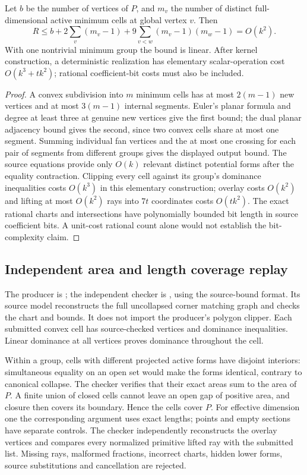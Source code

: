 \begin{proposition}
Let $b$ be the number of vertices of $P$, and $m_v$ the number of distinct
full-dimensional active minimum cells at global vertex $v$. Then
\[
 R\le b+2\sum_v(m_v-1)
           +9\sum_{v<w}(m_v-1)(m_w-1)=O(k^2).
\]
With one nontrivial minimum group the bound is linear. After kernel
construction, a deterministic realization has elementary scalar-operation cost
$O(k^3+tk^2)$; rational coefficient-bit costs must also be included.
\end{proposition}
\begin{proof}
A convex subdivision into $m$ minimum cells has at most $2(m-1)$ new
vertices and at most $3(m-1)$ internal segments. Euler's planar formula
and degree at least three at genuine new vertices give the first bound;
the dual planar adjacency bound gives the second, since two convex cells
share at most one segment. Summing individual fan vertices and the at most
one crossing for each pair of segments from different groups gives the
displayed output bound. The source equations provide only $O(k)$ relevant
distinct potential forms after the equality contraction.
Clipping every cell against its group's dominance inequalities costs
$O(k^3)$ in this elementary construction; overlay costs $O(k^2)$ and lifting
at most $O(k^2)$ rays into $7t$ coordinates costs $O(tk^2)$.
The exact rational charts and intersections have polynomially bounded bit
length in source coefficient bits. A unit-cost rational count alone would
not establish the bit-complexity claim.
\end{proof}

\subsection{Independent area and length coverage replay}

\begin{sloppypar}
The producer is ; the independent checker is
, using the source-bound
 format. Its source model reconstructs the
full uncollapsed corner matching graph and checks the chart and bounds.
It does not import the producer's polygon clipper. Each submitted convex
cell has source-checked vertices and dominance inequalities. Linear
dominance at all vertices proves dominance throughout the cell.
\end{sloppypar}

Within a group, cells with different projected active forms have disjoint
interiors: simultaneous equality on an open set would make the forms
identical, contrary to canonical collapse. The checker verifies that their
exact areas sum to the area of $P$. A finite union of closed cells cannot
leave an open gap of positive area, and closure then covers its boundary.
Hence the cells cover $P$. For effective dimension one the corresponding
argument uses exact lengths; points and empty sections have separate
controls. The checker independently reconstructs the overlay vertices and
compares every normalized primitive lifted ray with the submitted list.
Missing rays, malformed fractions, incorrect charts, hidden lower forms,
source substitutions and cancellation are rejected.

